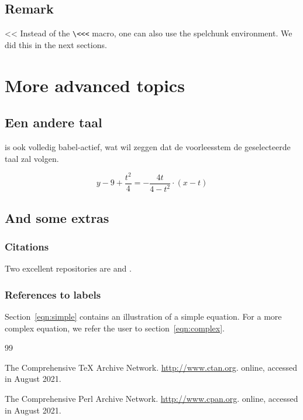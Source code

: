 \documentclass{report}
\begin{document}
\section{Remark}
\<<<{
Instead of the \texttt{\textbackslash{}<<<} macro, one can also use the
spelchunk environment. We did this in the next sections.
}

\chapter{More advanced topics}

\section{Een andere taal}
\begin{spelchunk}
\spelatex{} is ook volledig babel-actief, wat wil zeggen dat de
voorleesstem de geselecteerde taal zal volgen.
\end{spelchunk}

\begin{spelchunk}[arealink]
  \[
  y-9+\frac{t^2}{4} = -\frac{4t}{4-t^2} \cdot (x-t)
  \]
\end{spelchunk}


\section{And some extras}
\subsection{Citations}
\begin{spelchunk}
Two excellent repositories are \CPAN{} \cite{CPAN} and \CTAN{} \cite{CTAN}.
\end{spelchunk}

\subsection{References to labels}
\begin{spelchunk}
Section~\ref{eqn:simple} contains an illustration of a simple
equation. For a more complex equation, we refer the user to
section~\ref{eqn:complex}.
\end{spelchunk}




\begin{thebibliography}{99}

The Comprehensive \TeX{} Archive Network.
\newblock \url{http://www.ctan.org}.
\newblock online, accessed in August 2021.

The Comprehensive Perl Archive Network.
\newblock \url{http://www.cpan.org}.
\newblock online, accessed in August 2021.

\end{thebibliography}
\end{document}
